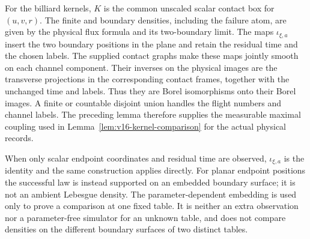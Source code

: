 For the billiard kernels, $K$ is the common unscaled scalar contact box
for $(u,v,r)$.  The finite and boundary densities, including the failure
atom, are given by the physical flux formula and its two-boundary limit.
The maps $\iota_{\xi,a}$ insert the two boundary positions in the plane
and retain the residual time and the chosen labels.  The supplied contact
graphs make these maps jointly smooth on each channel component.
Their inverses on the physical images are the transverse projections in
the corresponding contact frames, together with the unchanged time and
labels.  Thus they are Borel isomorphisms onto their Borel images.
A finite or countable disjoint union
handles the flight numbers and channel labels.  The preceding lemma
therefore supplies the measurable maximal coupling used in
Lemma~\ref{lem:v16-kernel-comparison} for the actual physical records.

When only scalar endpoint coordinates and residual time are observed,
$\iota_{\xi,a}$ is the identity and the same construction applies directly.
For planar endpoint positions the successful law is instead supported on
an embedded boundary surface; it is not an ambient Lebesgue density.
The parameter-dependent embedding is used only to prove a comparison at
one fixed table.  It is neither an extra observation nor a parameter-free
simulator for an unknown table, and does not compare densities on the
different boundary surfaces of two distinct tables.

